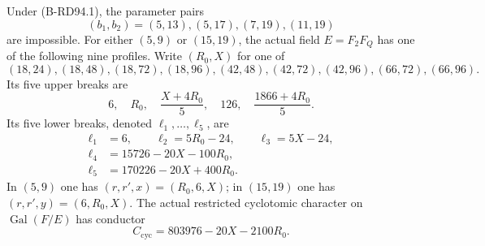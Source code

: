 \begin{proposition}
\label{prop:B-RD94-profiles}
Under (B-RD94.1), the parameter pairs
\[
             (b_1,b_2)=(5,13),(5,17),(7,19),(11,19)   \tag{B-RD94.14}
\]
are impossible. For either $(5,9)$ or $(15,19)$, the actual field
$E=F_2F_Q$ has one of the following nine profiles. Write $(R_0,X)$
for one of
\[
 (18,24),(18,48),(18,72),(18,96),
 (42,48),(42,72),(42,96),(66,72),(66,96).              \tag{B-RD94.15}
\]
Its five upper breaks are
\[
 6,\quad R_0,\quad\frac{X+4R_0}{5},\quad126,\quad
                   \frac{1866+4R_0}{5}.              \tag{B-RD94.16}
\]
Its five lower breaks, denoted $\ell_1,\ldots,\ell_5$, are
\[
\begin{split}
 \ell_1&=6,\qquad \ell_2=5R_0-24,\qquad\ell_3=5X-24,\\
 \ell_4&=15726-20X-100R_0,\\
 \ell_5&=170226-20X+400R_0.
\end{split}                                           \tag{B-RD94.17}
\]
In $(5,9)$ one has $(r,r',x)=(R_0,6,X)$; in $(15,19)$ one has
$(r,r',y)=(6,R_0,X)$. The actual restricted cyclotomic character
on $\operatorname{Gal}(F/E)$ has conductor
\[
                  C_{\mathrm{cyc}}=803976-20X-2100R_0.
                                                        \tag{B-RD94.18}
\]
\end{proposition}
